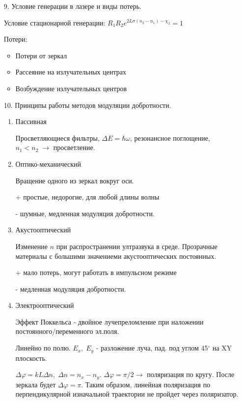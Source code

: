 \documentclass[a4paper]{article}
\begin{document}
\begin{itemize}
	\item[9.] Условие генерации в лазере и виды потерь. \par 
		Условие стационарной генерации: $R_1R_2 e^{2L\sigma(n_2-n_1)-\chi_2} = 1$ \par 
		Потери: 
		\begin{itemize}
			\item Потери от зеркал
			\item Рассеяние на излучательных центрах
			\item Возбуждение излучательных центров
		\end{itemize}

	\item[10.] Принципы работы методов модуляции добротности. \par 
		\begin{enumerate}
			\item Пассивная \par 
				Просветляющиеся фильтры, $\Delta E = \hbar \omega$, резонансное поглощение, $n_1<n_2\; \rightarrow$ просветление.
			\item Оптико-механический  \par 
				Вращение одного из зеркал вокруг оси. \par 
				+ простые, недорогие, для любой длины волны \par 
				- шумные, медленная модуляция добротности.
			\item Акустооптический \par 
				Изменение $n$ при распространении ултразвука в среде. Прозрачные материалы с большими значениеми
				акустооптических постоянных. \par 
				+ мало потерь, могут работать в импульсном режиме \par 
				- медленная модуляция добротности.
			\item Электрооптический \par 
				Эффект Поккельса - двойное лучепреломление при наложении постоянного/переменного эл.поля. \par 
				Линейно по полю. $E_x,\; E_y$ - разложение луча, пад. под углом 45$^{\circ}$ на XY плоскость. \par 
				$\Delta \varphi = k L \Delta n, \; \Delta n = n_x - n_y$. $\Delta \varphi= \pi/2 \rightarrow $ поляризация по кругу. После зеркала будет $\Delta \varphi = \pi$. Таким образом,
				линейная поляризация по перпендикулярной изначальной траектории не пройдет через поляризатор.
		\end{enumerate}


\end{itemize}
\end{document}
